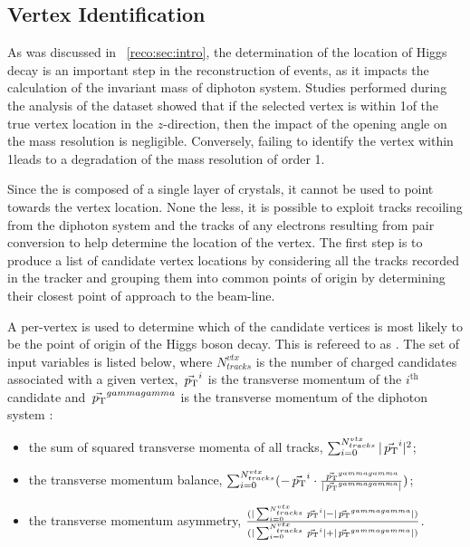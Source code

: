 \subsection{Vertex Identification}
As was discussed in \Sec~\ref{reco:sec:intro}, the determination of the location of Higgs decay is an important step in the reconstruction of \Hgg events, as it impacts the calculation of the invariant mass of diphoton system. Studies performed during the analysis of the \RunI dataset showed that if the selected vertex is within 1\cm of the true vertex location in the $z$-direction, then the impact of the opening angle on the mass resolution is negligible. Conversely, failing to identify the vertex within 1\cm leads to a degradation of the mass resolution of order 1\GeV. %

Since the \CMS \ECAL is composed of a single layer of crystals, it cannot be used to point towards the vertex location. %
None the less, it is possible to exploit tracks recoiling from the diphoton system and the tracks of any electrons resulting from pair conversion to help determine the location of the vertex.
The first step is to produce a list of candidate vertex locations by considering all the tracks recorded in the tracker and grouping them into common points of origin by determining their closest point of approach to the beam-line.

A per-vertex \BDT is used to determine which of the candidate vertices is most likely to be the point of origin of the Higgs boson decay. This \BDT is refereed to as \VtxIdBdt. The set of input variables is listed below, where $N_{tracks}^{vtx}$ is the number of charged \PF candidates associated with a given vertex, $\vec{\,p_\text{T}}^i$ is the transverse momentum of the $i^{\textrm{th}}$ candidate and $\vec{\,p_\text{T}}^{gammagamma}$ is the transverse momentum of the diphoton system :
\begin{itemize}
\item the sum of squared transverse momenta of all tracks, $\sum_{i=0}^{N_{tracks}^{vtx}} | \vec{\,p_\text{T}}^{i} |^2$;
\item the transverse momentum balance,  $\sum_{i=0}^{N_{tracks}^{vtx}} (- \vec{\,p_\text{T}}^i \cdot \frac{\vec{\,p_\text{T}}^{gammagamma}}{|\vec{\,p_\text{T}}^{gammagamma}| })$;
\item the transverse momentum asymmetry,  $\frac{(|\sum_{i=0}^{N_{tracks}^{vtx}} \vec{\,p_\text{T}}^i| - |\vec{\,p_\text{T}}^{gammagamma}|)}{(|\sum_{i=0}^{N_{tracks}^{vtx}} \vec{\,p_\text{T}}^i| + |\vec{\,p_\text{T}}^{gammagamma}|)}$.
\end{itemize}

